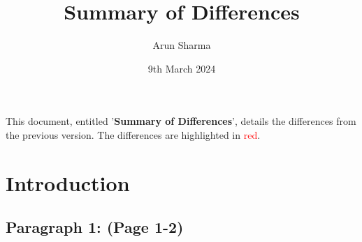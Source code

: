 \documentclass[twoside,leqno,onecolumn]{article}
\begin{document}

\title{\Large Summary of Differences}
\author[]{Arun Sharma}
\date{9th March 2024}



\maketitle







This document, entitled '\textbf{Summary of Differences}', details the differences from the previous version. The differences are highlighted in \textcolor{red}{red}.

\section{Introduction}
\subsection{Paragraph 1: (Page 1-2)\\} 
\end{document}
